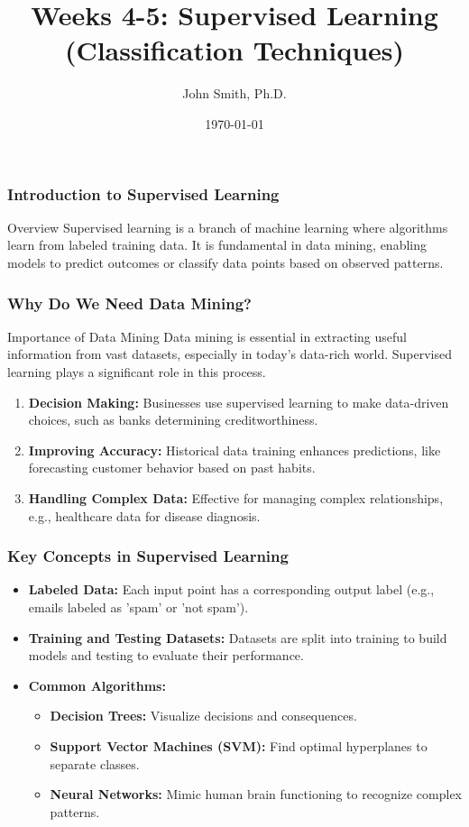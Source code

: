 \documentclass[aspectratio=169]{beamer}
\title[Supervised Learning]{Weeks 4-5: Supervised Learning (Classification Techniques)}
\author[J. Smith]{John Smith, Ph.D.}
\institute[University Name]{
  Department of Computer Science\\
  University Name\\
  \vspace{0.3cm}
  Email: email@university.edu\\
  Website: www.university.edu
}
\date{\today}
\begin{document}
\frame{\titlepage}

\begin{frame}[fragile]
    \frametitle{Introduction to Supervised Learning}
    \begin{block}{Overview}
        Supervised learning is a branch of machine learning where algorithms learn from labeled training data. It is fundamental in data mining, enabling models to predict outcomes or classify data points based on observed patterns.
    \end{block}
\end{frame}

\begin{frame}[fragile]
    \frametitle{Why Do We Need Data Mining?}
    \begin{block}{Importance of Data Mining}
        Data mining is essential in extracting useful information from vast datasets, especially in today's data-rich world. Supervised learning plays a significant role in this process.
    \end{block}
    \begin{enumerate}
        \item \textbf{Decision Making:} Businesses use supervised learning to make data-driven choices, such as banks determining creditworthiness.
        \item \textbf{Improving Accuracy:} Historical data training enhances predictions, like forecasting customer behavior based on past habits.
        \item \textbf{Handling Complex Data:} Effective for managing complex relationships, e.g., healthcare data for disease diagnosis.
    \end{enumerate}
\end{frame}

\begin{frame}[fragile]
    \frametitle{Key Concepts in Supervised Learning}
    \begin{itemize}
        \item \textbf{Labeled Data:} Each input point has a corresponding output label (e.g., emails labeled as 'spam' or 'not spam').
        \item \textbf{Training and Testing Datasets:} Datasets are split into training to build models and testing to evaluate their performance.
        \item \textbf{Common Algorithms:}
            \begin{itemize}
                \item \textbf{Decision Trees:} Visualize decisions and consequences.
                \item \textbf{Support Vector Machines (SVM):} Find optimal hyperplanes to separate classes.
                \item \textbf{Neural Networks:} Mimic human brain functioning to recognize complex patterns.
            \end{itemize}
    \end{itemize}
\end{frame}
\end{document}
